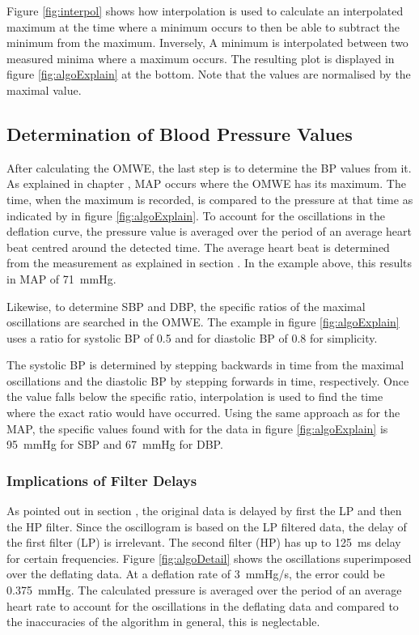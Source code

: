 Figure \ref{fig:interpol} shows how interpolation is used to calculate an interpolated maximum at the time where a minimum occurs to then be able to subtract the minimum from the maximum. Inversely, A minimum is interpolated between two measured minima where a maximum occurs. The resulting plot is displayed in figure \ref{fig:algoExplain} at the bottom. Note that the values are normalised by the maximal value.


\subsection{Determination of Blood Pressure Values}
After calculating the OMWE, the last step is to determine the BP values from it. As explained in chapter , MAP occurs where the OMWE has its maximum. The time, when the maximum is recorded, is compared to the pressure at that time as indicated by  in figure \ref{fig:algoExplain}. To account for the oscillations in the deflation curve, the pressure value is averaged over the period of an average heart beat centred around the detected time. The average heart beat is determined from the measurement as explained in section . In the example above, this results in MAP of \SI{71}{\mmHg}.

Likewise, to determine SBP and DBP, the specific ratios of the maximal oscillations are searched in the OMWE. The example in figure \ref{fig:algoExplain} uses a ratio for systolic BP of 0.5 and for diastolic BP of 0.8 for simplicity.

The systolic BP is determined by stepping backwards in time from the maximal oscillations and the diastolic BP by stepping forwards in time, respectively. Once the value falls below the specific ratio, interpolation is used to find the time where the exact ratio would have occurred. Using the same approach as for the MAP, the specific values found with  for the data in figure \ref{fig:algoExplain} is \SI{95}{\mmHg} for SBP and \SI{67}{\mmHg} for DBP.

\subsubsection{Implications of Filter Delays}\label{sec:impfilt}
As pointed out in section , the original data is delayed by first the LP and then the HP filter. Since the oscillogram is based on the LP filtered data, the delay of the first filter (LP) is irrelevant. The second filter (HP) has up to \SI{125}{\milli\second} delay for certain frequencies. Figure \ref{fig:algoDetail} shows the oscillations superimposed over the deflating data. At a deflation rate of \SI{3}{\mmHg/\second}, the error could be \SI{0.375}{\mmHg}. The calculated pressure is averaged over the period of an average heart rate to account for the oscillations in the deflating data and compared to the inaccuracies of the algorithm in general, this is neglectable. 



